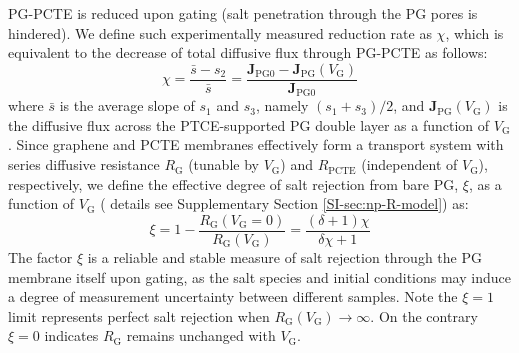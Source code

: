 PG-PCTE is reduced upon gating (\ie salt penetration through the PG
pores is hindered).
%
We define such experimentally measured reduction
rate as $\chi$, which is equivalent to the decrease of total diffusive
flux through PG-PCTE as follows:
\begin{equation}
  \label{eq:np-rejection}
  \chi = \frac{\bar{s} - s_{2}}{\bar{s}} = \frac{\symbf{J}_{\mathrm{PG0}}
    - \symbf{J}_{\mathrm{PG}}(V_{\mathrm{G}})}{\symbf{J}_{\mathrm{PG0}}}
\end{equation}
where $\bar{s}$ is the average slope of $s_{1}$ and $s_{3}$, namely
$(s_{1} + s_{3})/2$, and
$\symbf{J}_{\mathrm{PG}}(V_{\mathrm{G}})$ is the diffusive flux
across the PTCE-supported PG double layer as a function of
$V_{\mathrm{G}}$. Since graphene and PCTE membranes effectively form a
transport system with series diffusive resistance $R_{\mathrm{G}}$
(tunable by $V_{\mathrm{G}}$) and $R_{\mathrm{PCTE}}$ (independent of
$V_{\mathrm{G}}$), respectively, we define the effective degree of
salt rejection from bare PG, $\xi$, as a function of $V_{\mathrm{G}}$ (
details see Supplementary Section \autoref{SI-sec:np-R-model}) as:
\begin{equation}
\label{eq:np-xi-def}
\xi = 1 - \frac{R_{\mathrm{G}}(V_{\mathrm{G}}=0)}{R_{\mathrm{G}}(V_{\mathrm{G}})} = \frac{(\delta+1) \chi}{\delta \chi + 1}
\end{equation}
The factor $\xi$ is a reliable and stable measure of salt rejection
through the PG membrane itself upon gating, as the salt species and
initial conditions may induce a degree of measurement uncertainty
between different samples. Note the $\xi=1$ limit represents
perfect salt rejection when
$R_{\mathrm{G}}(V_{\mathrm{G}}) \to \infty$. On the contrary $\xi=0$
indicates $R_{\mathrm{G}}$ remains unchanged with $V_{\mathrm{G}}$.

